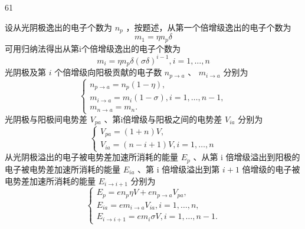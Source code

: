 \begin{solution}{61}
    \begin{subsolution}
        设从光阴极逸出的电子个数为 $n_{p}$ ，按题述，从第一个倍增级逸出的电子个数为
        \begin{equation}
            m _ {1} = \eta n _ {p} \delta
            \label{eq:1.s61}
        \end{equation}
        可用归纳法得出从第i个倍增级逸出的电子个数为
        \begin{equation}
            m _ {i} = \eta n _ {p} \delta (\sigma \delta)^{i - 1}, i = 1, \dots , n
            \label{eq:2.s61}
        \end{equation}
        光阴极及第 $i$ 个倍增级向阳极贡献的电子数 $n_{p\to a}$ 、 $m_{i\to a}$ 分别为
        \begin{equation}
            \left\{
            \begin{array}{l}
                n _ {p \rightarrow a} = n _ {p} (1 - \eta), \\
                m _ {i \rightarrow a} = m _ {i} (1 - \sigma), i = 1, \dots , n - 1, \\
                m _ {n \rightarrow a} = m _ {n}.
            \end{array}
            \right.
            \label{eq:3.s61}
        \end{equation}
        光阴极与阳极间电势差 $V_{pa}$ 、第i倍增级与阳极之间的电势差 $V_{ia}$ 分别为
        \begin{equation}
            \left\{
            \begin{array}{l}
                V _ {p a} = (1 + n) V, \\
                V _ {i a} = (n - i + 1) V, i = 1, \dots , n
            \end{array}
            \right.
            \label{eq:4.s61}
        \end{equation}
        从光阴极溢出的电子被电势差加速所消耗的能量 $E_{p}$ 、从第 i 倍增级溢出到阳极的电子被电势差加速所消耗的能量 $E_{ia}$ 、第 i 倍增级溢出到第 $i+1$ 倍增级的电子被电势差加速所消耗的能量 $E_{i\rightarrow i+1}$ 分别为
        \begin{equation}
            \left\{
            \begin{array}{l}
                E _ {p} = e n _ {p} \eta V + e n _ {p \rightarrow a} V _ {p a}, \\
                E _ {i a} = e m _ {i \rightarrow a} V _ {i a}, i = 1, \dots , n, \\
                E _ {i \rightarrow i + 1} = e m _ {i} \sigma V, i = 1, \dots , n - 1.

\end{array}
\end{equation}
\end{subsolution}
\end{solution}
